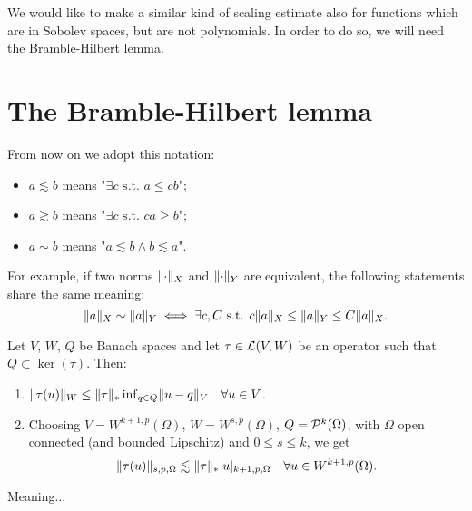 We would like to make a similar kind of scaling estimate also for functions which are in Sobolev spaces, but are not polynomials. In order to do so, we will need the Bramble-Hilbert lemma.


\section{The Bramble-Hilbert lemma}
From now on we adopt this notation:
\begin{itemize}
\item $a \lesssim b$ means "$\exists c \text{ s.t. } a \le cb$";
\item $a \gtrsim b$ means "$\exists c \text{ s.t. } ca \ge b$";
\item $a \sim b$ means "$a \lesssim b \wedge b \lesssim a$".
\end{itemize}
For example, if two norms $\norm{\cdot}_X$ and $\norm{\cdot}_Y$ are equivalent, the following statements share the same meaning:
\[
\norm{a}_X \sim \norm{a}_Y \iff \exists c,C \text{ s.t. } c\norm{a}_X \le \norm{a}_Y \le C \norm{a}_X.
\]

\begin{lemma}
Let $V$, $W$, $Q$ be Banach spaces and let $\tau \in \L(V,W)$ be an operator such that $Q \subset \ker(\tau)$. Then:
\begin{enumerate}
\item $\norm{\tau(u)}_W \le \norm{\tau}_* \inf_{q \in Q} \norm{u-q}_V \quad \forall u\in V$.
\item Choosing $V=W^{k+1,p}(\Omega)$, $W=W^{s,p}(\Omega)$, $Q=\P^k(\Omega)$, with $\Omega$ open connected (and bounded Lipschitz) and $0\le s \le k$, we get
\[
\norm{\tau(u)}_{s,p,\Omega} \lesssim \norm{\tau}_* \abs{u}_{k+1,p,\Omega} \quad \forall u\in W^{k+1,p}(\Omega).
\]
\end{enumerate}
\end{lemma}
\begin{remark} Meaning...
\end{remark}

